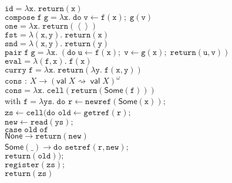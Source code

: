 \documentclass[nocopyrightspace,preprint]{sigplanconf}
\newcommand{\term}[1]{\ensuremath{\mathtt{{#1}}}}
\newcommand{\shrink}{\rightsquigarrow}
\newcommand{\unitval}{\left<\right>}
\newcommand{\interpu}[1]{(\!|{#1}|\!)_u}
\newcommand{\valtype}[1]{\mathsf{val}\;{#1}}
\newcommand{\None}{\mathsf{None}}
\newcommand{\Some}[1]{\mathsf{Some}({#1})}
\newcommand{\fun}[2]{\lambda {#1}.\;{#2}}
\newcommand{\fix}[2]{\term{fix}\;{#1}.\;{#2}}
\begin{document}
\begin{figure}
{\small
\begin{tabbing}
\term{id = \fun{x}{return(x)}} 
\\
\term{compose\;f\;g = \fun{x}{do\;v\leftarrow f(x);\;g(v)}}
\\
\term{one = \fun{x}{return(\unitval)}}
\\
\term{fst = \fun{(x,y)}{return(x)}}
\\
\term{snd = \fun{(x,y)}{return(y)}}
\\
\term{pair\;f\;g = \fun{x}{(do\;u\leftarrow f(x);\;v \leftarrow g(x);\; return(u,v))}}
\\
\term{eval = \fun{(f,x)}{f(x)}}
\\
\term{curry\;f = \fun{x}{return(\fun{y}{f(x,y)})}}
\\[0.5em]

\term{cons} : $X \to (\valtype{X} \shrink \;\valtype{X})^\omega$ \\
\term{cons = \lambda x.\; cell(return(\Some{f}))} \\
with \term{f = \lambda ys.\;do} \= \term{r \leftarrow newref(\Some{x});} \\
\>     \term{zs \leftarrow cell(}\= 
      \term{do} \=\term{old \leftarrow getref(r);} \\
\> \> \> \term{new \leftarrow read(ys);} \\
\> \> \> \term{case\;old\;of} \\
\> \> \> \;\;\= \term{\None \to return(new)} \\
\> \> \> \>     \term{\Some{\_} \to do} \=\term{setref(r, new);} \\
\> \> \> \>  \>                           \term{return(old));} \\                 
\> \term{register(zs);} \\
\> \term{return(zs)}\\[0.5em]



\end{tabbing}}
\end{figure}
\end{document}
